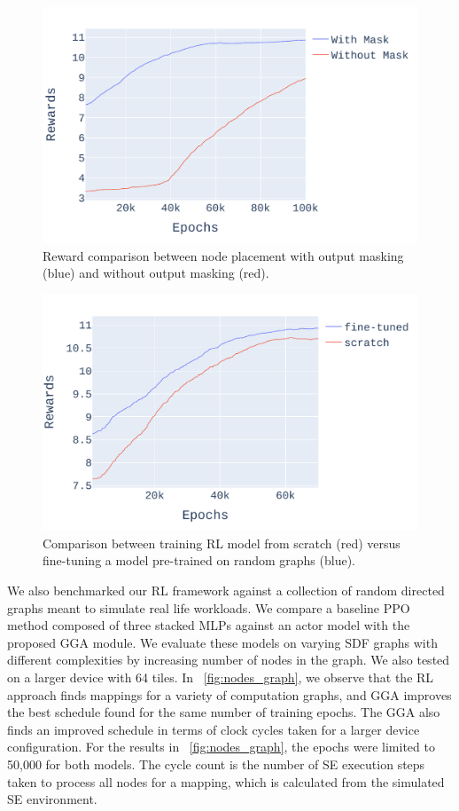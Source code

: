 \begin{figure}[tb]
  \centering
  \includegraphics[width=\linewidth]{fig/ifft_masked_nomask.pdf}
  \caption{Reward comparison between node placement with output masking (blue) and without output masking (red).}
  \label{fig:mask_nomask}
\end{figure}

\begin{figure}[tb]
  \centering
  \includegraphics[width=\linewidth]{fig/pretrain_ifft.pdf}
  \caption{Comparison between training RL model from scratch (red) versus fine-tuning a model pre-trained on random graphs (blue). }
  \label{fig:pretrain_ifft}
\end{figure}

We also benchmarked our RL framework against a collection of random directed graphs meant to simulate real life workloads. 
We compare a baseline PPO method composed of three stacked MLPs against an actor model with the proposed GGA module.
We evaluate these models on varying SDF graphs with different complexities by increasing number of nodes in the graph. 
We also tested on a larger device with 64 tiles.
In \figurename~\ref{fig:nodes_graph}, we observe that the RL approach finds mappings for a variety of computation graphs, and GGA improves the best schedule found for the same number of training epochs. 
The GGA also finds an improved schedule in terms of clock cycles taken for a larger device configuration. 
For the results in \figurename~\ref{fig:nodes_graph}, the epochs were limited to 50,000 for both models. 
The cycle count is the number of SE execution steps taken to process all nodes for a mapping, which is calculated from the simulated SE environment. 

